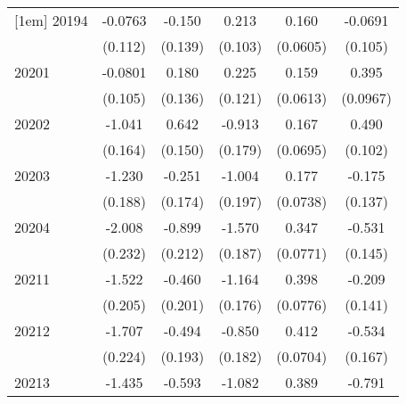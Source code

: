 {\begin{tabular}{l*{5}{c}}
[1em]
20194               &     -0.0763         &      -0.150         &       0.213\sym{*}  &       0.160\sym{**} &     -0.0691         \\
                    &     (0.112)         &     (0.139)         &     (0.103)         &    (0.0605)         &     (0.105)         \\
[1em]
20201               &     -0.0801         &       0.180         &       0.225         &       0.159\sym{**} &       0.395\sym{***}\\
                    &     (0.105)         &     (0.136)         &     (0.121)         &    (0.0613)         &    (0.0967)         \\
[1em]
20202               &      -1.041\sym{***}&       0.642\sym{***}&      -0.913\sym{***}&       0.167\sym{*}  &       0.490\sym{***}\\
                    &     (0.164)         &     (0.150)         &     (0.179)         &    (0.0695)         &     (0.102)         \\
[1em]
20203               &      -1.230\sym{***}&      -0.251         &      -1.004\sym{***}&       0.177\sym{*}  &      -0.175         \\
                    &     (0.188)         &     (0.174)         &     (0.197)         &    (0.0738)         &     (0.137)         \\
[1em]
20204               &      -2.008\sym{***}&      -0.899\sym{***}&      -1.570\sym{***}&       0.347\sym{***}&      -0.531\sym{***}\\
                    &     (0.232)         &     (0.212)         &     (0.187)         &    (0.0771)         &     (0.145)         \\
[1em]
20211               &      -1.522\sym{***}&      -0.460\sym{*}  &      -1.164\sym{***}&       0.398\sym{***}&      -0.209         \\
                    &     (0.205)         &     (0.201)         &     (0.176)         &    (0.0776)         &     (0.141)         \\
[1em]
20212               &      -1.707\sym{***}&      -0.494\sym{*}  &      -0.850\sym{***}&       0.412\sym{***}&      -0.534\sym{**} \\
                    &     (0.224)         &     (0.193)         &     (0.182)         &    (0.0704)         &     (0.167)         \\
[1em]
20213               &      -1.435\sym{***}&      -0.593\sym{**} &      -1.082\sym{***}&       0.389\sym{***}&      -0.791\sym{***}\\

\end{tabular}}
